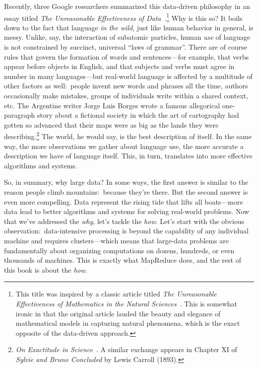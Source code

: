 Recently, three Google researchers summarized this data-driven
philosophy in an essay titled {\it The Unreasonable Effectiveness of
  Data}~\cite{Halevy_etal_2009}.\footnote{This title was inspired by a
  classic article titled {\it The Unreasonable Effectiveness of
    Mathematics in the Natural Sciences}~\cite{Wigner_1960}.  This is
  somewhat ironic in that the original article lauded the beauty and
  elegance of mathematical models in capturing natural phenomena,
  which is the exact opposite of the data-driven approach.} Why is
this so?  It boils down to the fact that language {\it in the wild},
just like human behavior in general, is messy.  Unlike, say, the
interaction of subatomic particles, human {\it use} of language is not
constrained by succinct, universal ``laws of grammar''.  There are of
course rules that govern the formation of words and sentences---for
example, that verbs appear before objects in English, and that
subjects and verbs must agree in number in many languages---but
real-world language is affected by a multitude of other factors as
well:\ people invent new words and phrases all the time, authors
occasionally make mistakes, groups of individuals write within a
shared context, etc.  The Argentine writer Jorge Luis Borges wrote a
famous allegorical one-paragraph story about a fictional society in
which the art of cartography had gotten so advanced that their maps
were as big as the lands they were describing.\footnote{{\it On
    Exactitude in Science}~\cite{Borges_1999}.  A similar exchange
  appears in Chapter XI of {\it Sylvie and Bruno Concluded} by Lewis
  Carroll (1893).} The world, he would say, is the best description of
itself.  In the same way, the more observations we gather about
language use, the more accurate a description we have of language
itself.  This, in turn, translates into more effective algorithms and
systems.

So, in summary, why large data?  In some ways, the first answer is
similar to the reason people climb mountains:\ because they're there.
But the second answer is even more compelling.  Data represent the
rising tide that lifts all boats---more data lead to better algorithms
and systems for solving real-world problems.  Now that we've addressed
the {\it why}, let's tackle the {\it how}.  Let's start with the
obvious observation:\ data-intensive processing is beyond the
capability of any individual machine and requires clusters---which
means that large-data problems are fundamentally about organizing
computations on dozens, hundreds, or even thousands of machines.  This
is exactly what MapReduce does, and the rest of this book is about the
{\it how}.

